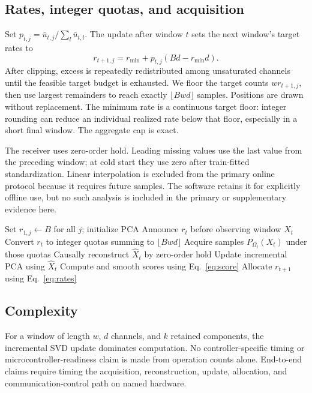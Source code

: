 \documentclass[12pt]{article}
\begin{document}
\subsection{Rates, integer quotas, and acquisition}

Set $p_{t,j}=\bar u_{t,j}/\sum_l\bar u_{t,l}$. The update after window $t$
sets the next window's target rates to
\begin{equation}
 r_{t+1,j}=r_{\min}+p_{t,j}(Bd-r_{\min}d).
\label{eq:rates}
\end{equation}
After clipping, excess is repeatedly redistributed among unsaturated channels
until the feasible target budget is exhausted. We floor
the target counts $wr_{t+1,j}$, then use largest remainders to reach exactly
$\lfloor Bwd\rfloor$ samples. Positions are drawn without replacement. The minimum rate is a continuous
target floor: integer rounding can reduce an individual realized rate below
that floor, especially in a short final window. The aggregate cap is exact.

The receiver uses zero-order hold. Leading missing values use the last value
from the preceding window; at cold start they use zero after train-fitted
standardization. Linear interpolation is excluded from the primary online
protocol because it requires future samples. The software retains it for explicitly offline use, but no such analysis is
included in the primary or supplementary evidence here.

\begin{algorithm}[t]
\caption{Causal PCA-guided rate allocation}
\label{alg:causal}
\begin{algorithmic}[1]
\STATE Set $r_{1,j}\gets B$ for all $j$; initialize PCA
  \STATE Announce $r_t$ before observing window $X_t$
  \STATE Convert $r_t$ to integer quotas summing to $\lfloor Bwd\rfloor$
  \STATE Acquire samples $P_{\Omega_t}(X_t)$ under those quotas
  \STATE Causally reconstruct $\widehat X_t$ by zero-order hold
  \STATE Update incremental PCA using $\widehat X_t$
  \STATE Compute and smooth scores using Eq.~\eqref{eq:score}
  \STATE Allocate $r_{t+1}$ using Eq.~\eqref{eq:rates}
\ENDFOR
\end{algorithmic}
\end{algorithm}

\subsection{Complexity}

For a window of length $w$, $d$ channels, and $k$ retained components, the
incremental SVD update dominates computation. No controller-specific timing or microcontroller-readiness claim is made
from operation counts alone. End-to-end claims require timing the acquisition, reconstruction,
update, allocation, and communication-control path on named hardware.
\end{document}
